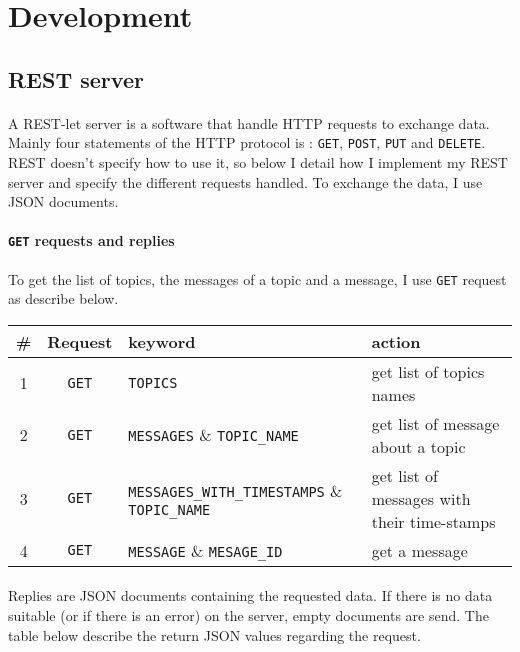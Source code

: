\section{Development}

\subsection{REST server}

\paragraph{}{
    A REST-let server is a software that handle HTTP requests to exchange data.
 Mainly four statements of the HTTP protocol is : \texttt{GET}, \texttt{POST},
 \texttt{PUT} and \texttt{DELETE}. REST doesn't specify how to use it, so below 
 I detail how I implement my REST server and specify the different requests 
 handled. To exchange the data, I use JSON documents.
}

\paragraph{\texttt{GET} requests and replies}{
    To get the list of topics, the messages of a topic and a message, I use 
 \texttt{GET} request as describe below.
}

\begin{tabular}{|c|c|p{4.3cm}|p{3.4cm}|}
\hline
\# & Request & keyword & action \\
\hline
1 & \texttt{GET} & \texttt{TOPICS} & get list of topics names \\
\hline
2 & \texttt{GET} & \texttt{MESSAGES} \& \texttt{TOPIC\_NAME} & get list of message about a topic \\
\hline
3 & \texttt{GET} & \texttt{MESSAGES\_WITH\_TIMESTAMPS} \& \texttt{TOPIC\_NAME} & get list of messages with their time-stamps \\
\hline
4 & \texttt{GET} & \texttt{MESSAGE} \& \texttt{MESAGE\_ID} & get a message \\
\hline
\end{tabular}

\paragraph{}{
    Replies are JSON documents containing the requested data. If there is no
 data suitable (or if there is an error) on the server, empty documents are 
 send. The table below describe the return JSON values regarding the request.
}


